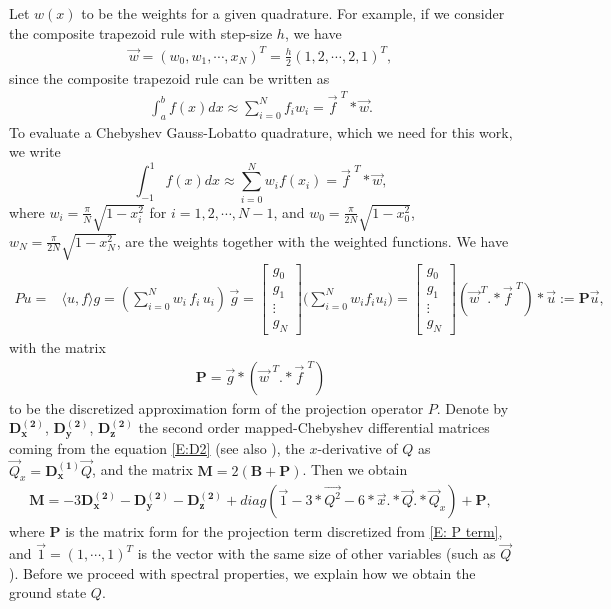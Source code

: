 \documentclass[12pt,letterpaper]{amsart}
\theoremstyle{remark}
\numberwithin{equation}{section}
\numberwithin{theorem}{section}
\numberwithin{table}{section}
\begin{document}
Let $w(x)$ to be the weights for a given quadrature. For example, if we consider the composite trapezoid rule with step-size $h$, we have
\begin{align*}
\vec{w}=(w_0,w_1,\cdots ,x_N)^T=\frac{h}{2}(1,2,\cdots,2,1)^T,
\end{align*}
since the composite trapezoid rule can be written as
\begin{align*}
\int_a^b f(x) dx \approx \sum_{i=0}^{N} f_i w_i=\vec{f}^{\,\, T} *\vec{w}.
\end{align*} 
To evaluate a Chebyshev Gauss-Lobatto quadrature, which we need for this work, we write 
$$
\int_{-1}^1 f(x) dx \approx \sum_{i=0}^N w_i f(x_i)=\vec{f}^{\,\, T} * \vec{w},
$$
where $w_i=\frac{\pi}{N}\sqrt{1-x_i^2}$ for $i=1,2,\cdots, N-1$, and $w_0=\frac{\pi}{2N}\sqrt{1-x_0^2}$, $w_N=\frac{\pi}{2N}\sqrt{1-x_N^2}$, are the weights together with the weighted functions.
We have
\begin{align*}
Pu=&\langle u,f \rangle g= (\sum_{i=0}^N w_i \,f_i\, u_i) \, \vec{g} 
= \left[\begin{matrix}
g_0\\
g_1\\
\vdots\\
g_N
\end{matrix}\right]  \big(\sum_{i=0}^N w_i f_i u_i \big) = \left[\begin{matrix}
g_0\\
g_1\\
\vdots\\
g_N
\end{matrix}\right]  (\vec{w}^{\, T}.*\vec{f}^{\,\, T}) * \vec{u} 
:= \mathbf{P} \vec{u},
\end{align*}
with the matrix
\begin{align}\label{E: P term}
\mathbf{P}=\vec{g}*(\vec{w}^{\,\, T}.*\vec{f}^{\,\, T})
\end{align}
to be the discretized approximation form of the projection operator $P$. 
Denote by $\mathbf{D_x^{(2)}}$, $\mathbf{D_y^{(2)}}$, $\mathbf{D_z^{(2)}}$ the second order mapped-Chebyshev differential matrices coming from the equation \eqref{E:D2} (see also \cite{T2001}), the $x$-derivative of $Q$ as $\vec{Q}_x=\mathbf{D_x^{(1)}}\vec{Q}$, and the matrix $\mathbf{M}=2(\mathbf{B}+\mathbf{P})$. Then we obtain
\begin{align}\label{E: M-matrix}
\mathbf{M}=-3\mathbf{{D}_x^{(2)}}-\mathbf{{D}_y^{(2)}}-\mathbf{{D}_z^{(2)}}+diag(\vec{1}-3*\vec{Q^2}-6*\vec{x}.*\vec{Q}.*\vec{Q}_x)+\mathbf{P},
\end{align}
where $\mathbf{P}$ is the matrix form for the projection term discretized from \eqref{E: P term}, and $\vec{1}=(1,\cdots,1)^T$ is the vector with the same size of other variables (such as $\vec{Q}$). Before we proceed with spectral properties, we explain how we obtain the ground state $Q$. 
\end{document}
